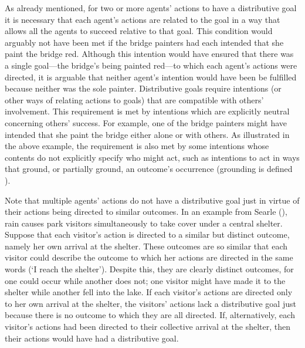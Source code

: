 \documentclass[12pt,a4paper]{extarticle}
\begin{document}

As already mentioned, for two or more agents' actions to have a distributive goal it is necessary that each agent's actions are related to the goal in a way that allows all the agents to succeed relative to that goal.  
This condition would arguably not have been met if the bridge painters had each intended that she paint the bridge red.
Although this intention would have ensured that there was a single goal---the bridge's being painted red---to which each agent's actions were directed, it is arguable that neither agent's intention would have been be fulfilled because neither was the sole painter.
Distributive goals require intentions (or other ways of relating actions to goals) that are compatible with others' involvement.
This requirement is met by intentions which are explicitly neutral concerning others' success.  
For example, one of the bridge painters might have intended that she paint the bridge either alone or with others.
As illustrated in the above example, the requirement is also met by some intentions whose contents do not explicitly specify who might act, such as intentions to act in ways that ground, or partially ground, an outcome's occurrence (grounding is defined ).


Note that multiple agents' actions do not have a distributive goal just in virtue of their actions being directed to similar outcomes.  
In an example from Searle (\citeyear[p.\ 92]{Searle:1990em}), rain causes park visitors simultaneously to take cover under a central shelter.  
Suppose that each visitor's action is directed to a similar but distinct outcome, namely her own arrival at the shelter.  
These outcomes are so similar that each visitor could describe the outcome to which her actions are directed in the same words (`I reach the shelter').
Despite this, they are clearly distinct outcomes, for one could occur while another does not; one visitor might have made it to the shelter while another fell into the lake.
If each visitor's actions are directed only to her own arrival at the shelter, the visitors' actions lack a distributive goal just because there is no outcome to which they are all directed.
If, alternatively, each visitor's actions had been directed to their collective arrival at the shelter, then their actions would have had a distributive goal.
\end{document}
